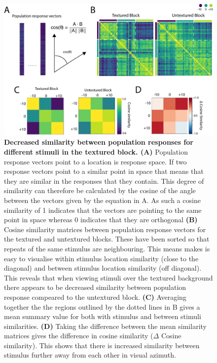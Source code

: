 \begin{figure}[!ht]
        \captionsetup{}
        \centering
        \includegraphics[width =  0.75\paperwidth]{Figures/R3_F3.pdf}
       \caption[\label{fig:R3_F5} \textbf{Decreased similarity between population responses for different stimuli in the textured block.}]{\label{fig:R3_F5} \textbf{Decreased similarity between population responses for different stimuli in the textured block. (A)} Population response vectors point to a location is response space. If two response vectors point to a similar point in space that means that they are similar in the responses that they contain. This degree of similarity can therefore be calculated by the cosine of the angle between the vectors given by the equation in A. As such a cosine similarity of 1 indicates that the vectors are pointing to the same point in space whereas 0 indicates that they are orthogonal \textbf{(B)} Cosine similarity matrices between population response vectors for the textured and untextured blocks. These have been sorted so that repeats of the same stimulus are neighbouring. This means makes is easy to visualise within stimulus location similarity (close to the diagonal) and between stimulus location similarity (off diagonal). This reveals that when viewing stimuli over the textured background there appears to be decreased similarity between population response compeared to the untextured block. \textbf{(C)} Averaging together the the regions outlined by the dotted lines in B gives a mean summary value for both with stimulus and between stimuli similarities. \textbf{(D)} Taking the difference between the mean similarity matrices gives the difference in cosine similarity ($\Delta$ Cosine similarity). This shows that there is increased similarity between stimulus further away from each other in visual azimuth.  
    }
\end{figure}



